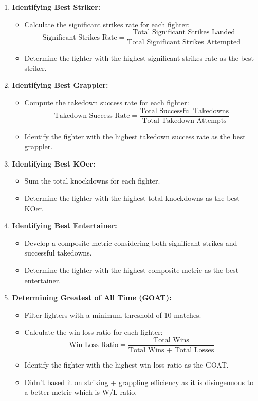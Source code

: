 \documentclass[
  man,floatsintext]{apa6}
\providecommand{\tightlist}{%
  \setlength{\itemsep}{0pt}\setlength{\parskip}{0pt}}
\begin{document}
\begin{enumerate}
\def\labelenumi{\arabic{enumi}.}
\tightlist
\item
  \textbf{Identifying Best Striker:}

  \begin{itemize}
  \tightlist
  \item
    Calculate the significant strikes rate for each fighter:
    \[ \text{Significant Strikes Rate} = \frac{\text{Total Significant Strikes Landed}}{\text{Total Significant Strikes Attempted}} \]
  \item
    Determine the fighter with the highest significant strikes rate as the best striker.
  \end{itemize}
\item
  \textbf{Identifying Best Grappler:}

  \begin{itemize}
  \tightlist
  \item
    Compute the takedown success rate for each fighter:
    \[ \text{Takedown Success Rate} = \frac{\text{Total Successful Takedowns}}{\text{Total Takedown Attempts}} \]
  \item
    Identify the fighter with the highest takedown success rate as the best grappler.
  \end{itemize}
\item
  \textbf{Identifying Best KOer:}

  \begin{itemize}
  \tightlist
  \item
    Sum the total knockdowns for each fighter.
  \item
    Determine the fighter with the highest total knockdowns as the best KOer.
  \end{itemize}
\item
  \textbf{Identifying Best Entertainer:}

  \begin{itemize}
  \tightlist
  \item
    Develop a composite metric considering both significant strikes and successful takedowns.
  \item
    Determine the fighter with the highest composite metric as the best entertainer.
  \end{itemize}
\item
  \textbf{Determining Greatest of All Time (GOAT):}

  \begin{itemize}
  \tightlist
  \item
    Filter fighters with a minimum threshold of 10 matches.
  \item
    Calculate the win-loss ratio for each fighter:
    \[ \text{Win-Loss Ratio} = \frac{\text{Total Wins}}{\text{Total Wins + Total Losses}} \]
  \item
    Identify the fighter with the highest win-loss ratio as the GOAT.
  \item
    Didn't based it on striking + grappling efficiency as it is disingenuous to a better metric which is W/L ratio.
  \end{itemize}
\end{enumerate}
\end{document}
